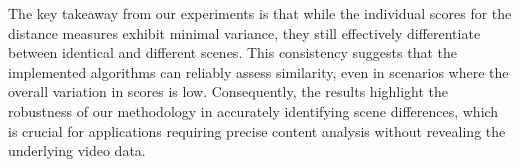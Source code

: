 The key takeaway from our experiments is that while the individual scores for the distance measures exhibit minimal variance, they still effectively differentiate between identical and different scenes. This consistency suggests that the implemented algorithms can reliably assess similarity, even in scenarios where the overall variation in scores is low. Consequently, the results highlight the robustness of our methodology in accurately identifying scene differences, which is crucial for applications requiring precise content analysis without revealing the underlying video data.
